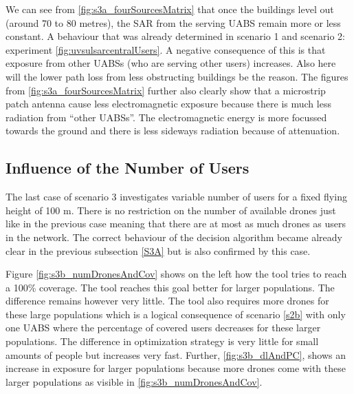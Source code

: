 We can see from \ref{fig:s3a_fourSourcesMatrix} that once the buildings level out (around 70 to 80 metres), the SAR from the serving UABS remain 
more or less constant. A behaviour that was already determined in scenario 1 and scenario 2: experiment \ref{fig:uvsulsarcentralUsers}. A negative consequence of 
this is that exposure from other \gls{UABS}s (who are serving  other users) increases. 
Also here will the lower path loss from  less obstructing buildings be the reason.
The figures from \ref{fig:s3a_fourSourcesMatrix} further also clearly show that a microstrip patch antenna cause less electromagnetic exposure because 
there is much less radiation from  ``other UABSs''.
The electromagnetic energy is more focussed towards the ground and there is less sideways radiation because of attenuation.


\FloatBarrier
\subsection{Influence of the Number of Users}
\label{S3B}

The last case of scenario 3 investigates variable number of users for a fixed flying height of 100 m. There is no 
restriction on the number of available drones just like in the previous case meaning that there are at most 
as much drones as users in the network. The correct behaviour of the decision algorithm became already clear in the previous subsection \ref{S3A} but is also
confirmed by this case.

Figure \ref{fig:s3b_numDronesAndCov} shows on the left how the tool tries to reach a 100\% coverage. The tool reaches this goal 
better for larger populations. The difference remains however very little. The tool also requires more drones for these large 
populations which is a logical consequence of scenario \ref{s2b} with only one \gls{UABS} where the percentage of covered users decreases for these larger populations.
 The difference in optimization strategy is very little for small amounts of people but increases very fast. Further, \ref{fig:s3b_dlAndPC}, shows an increase 
 in exposure for larger populations because more drones come with these larger populations as visible in \ref{fig:s3b_numDronesAndCov}.


